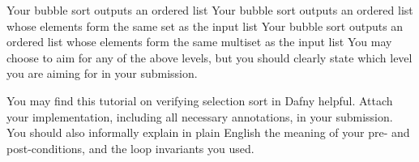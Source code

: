 \documentclass{jhwhw}
\begin{document}
Your bubble sort outputs an ordered list
Your bubble sort outputs an ordered list whose elements form the same set as the input list
Your bubble sort outputs an ordered list whose elements form the same multiset as the input list
You may choose to aim for any of the above levels, but you should clearly state which level you are aiming for in your submission.


You may find this tutorial on verifying selection sort in Dafny helpful.
\newline\newline
Attach your implementation, including all necessary annotations, in your submission. You should also informally explain in plain English the meaning of your pre- and post-conditions, and the loop invariants you used.
\solution
\end{document}

